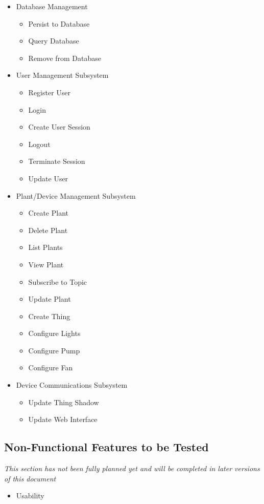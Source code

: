 \documentclass{article}
\begin{document}
		\begin{itemize}
			\item Database Management
				 \begin{itemize}
				 	\item Persist to Database
				 	\item Query Database
				 	\item Remove from Database
				 \end{itemize}
			\item User Management Subsystem
				\begin{itemize}
					\item Register User
					\item Login
					\item Create User Session
					\item Logout
					\item Terminate Session
					\item Update User
				\end{itemize}
			\item Plant/Device Management Subsystem
				\begin{itemize}
					\item Create Plant
					\item Delete Plant
					\item List Plants
					\item View Plant
					\item Subscribe to Topic
					\item Update Plant
					\item Create Thing
					\item Configure Lights
					\item Configure Pump
					\item Configure Fan
				\end{itemize}
			\item Device Communications Subsystem
				\begin{itemize}
					\item Update Thing Shadow
					\item Update Web Interface
				\end{itemize}
		\end{itemize}
	\subsection{Non-Functional Features to be Tested} 
		\textit{This section has not been fully planned yet and will be completed in later versions of this document}
		\begin{itemize}
			\item Usability
		\end{itemize}
		
\end{document}
